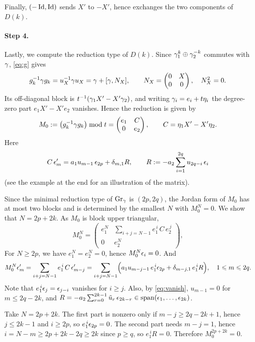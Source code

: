 \documentclass[11pt]{article}
\numberwithin{equation}{section}
\begin{document}
\begin{appendix}
Finally, $(-\operatorname{Id},\operatorname{Id})$ sends $X'$ to $-X'$, hence exchanges the two components of $D(k)$.

\paragraph{Step 4.} Lastly, we compute the reduction type of $D(k)$.
Since $\gamma_1^k\oplus\gamma_2^{-k}$ commutes with $\gamma$, \eqref{eq:g} gives
\[
g_k^{-1}\gamma g_k=u_X^{-1}\gamma u_X=\gamma+[\gamma,N_X],
\qquad
N_X=\begin{pmatrix}0&X\\0&0\end{pmatrix},
\quad N_X^2=0 .
\]
Its off-diagonal block is $t^{-1}(\gamma_1X'-X'\gamma_2)$, and writing
$\gamma_i=e_i+t\eta_i$ the degree-zero part $e_1X'-X'e_2$ vanishes. Hence the
reduction is given by
\[
M_0:=\bigl(g_k^{-1}\gamma g_k\bigr)\bmod t=
\begin{pmatrix}e_1&C\\0&e_2\end{pmatrix},
\qquad C=\eta_1X'-X'\eta_2.
\]
Here
\[
C\,\epsilon'_m=a_1u_{m-1}\,\epsilon_{2p}+\delta_{m,1}R,
\qquad
R:=-a_2\sum_{i=1}^{2q}u_{2q-i}\,\epsilon_i
\]
(see the example at the end for an illustration of the matrix). 

Since the minimal reduction type of $\operatorname{Gr}_\gamma$ is $(2p,2q)$, the Jordan form of
$M_0$ has at most two blocks and is determined by the smallest $N$ with
$M_0^N=0$. We show that $N=2p+2k$. As $M_0$ is block upper triangular,
\begin{equation}\label{eq:power}
M_0^{N}=
\begin{pmatrix}
e_1^{N} & \displaystyle\sum_{i+j=N-1}e_1^{\,i}\,C\,e_2^{\,j}\\[4pt]
0 & e_2^{N}
\end{pmatrix},
\end{equation}
For $N\geqslant 2p$, we have $e_1^N=e_2^N=0$, hence $M_0^N\epsilon_i=0$. And
\[
M_0^N\epsilon'_m= \sum_{i+j=N-1}e_1^{\,i}\,C\,\epsilon'_{m-j}
=\sum_{i+j=N-1}\Bigl(a_1u_{m-j-1}\,e_1^{\,i}\epsilon_{2p}+\delta_{m-j,1}\,e_1^{\,i}R\Bigr), \quad 1\leqslant m\leqslant 2q.
\]
Note that $e_1^{\,i}\epsilon_j=\epsilon_{j-i}$ vanishes for $i\geqslant j$. Also, by \eqref{eq:vanish}, $u_{m-1}=0$ for $m\leqslant 2q-2k$, and
$R=-a_2\sum_{r=0}^{2k-1}\tilde u_r\,\epsilon_{2k-r}\in\operatorname{span}(\epsilon_1,\dots,\epsilon_{2k})$.

Take $N=2p+2k$. The first
part is nonzero only if $m-j\geqslant 2q-2k+1$, hence $j\leqslant 2k-1$ and
$i\geqslant 2p$, so $e_1^{\,i}\epsilon_{2p}=0$. The second part needs $m-j=1$, hence
$i=N-m\geqslant 2p+2k-2q\geqslant 2k$ since $p\geqslant q$, so $e_1^{\,i}R=0$.
Therefore $M_0^{2p+2k}=0$.


\end{appendix}
\end{document}
